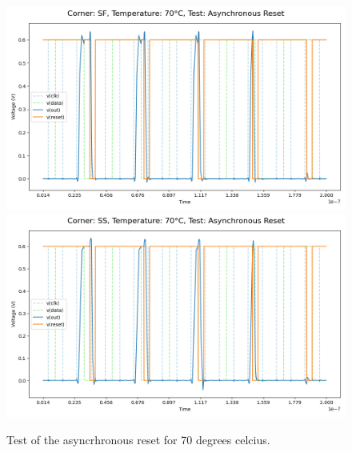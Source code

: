 \begin{figure}[H]
    \vspace{5pt}
    \includegraphics[height= 0.21\textheight]{figures/aimspice/SF/70/W2.csv.png}
    \vspace{5pt}
    \includegraphics[height= 0.21\textheight]{figures/aimspice/SS/70/W2.csv.png}
    \caption{Test of the asyncrhronous reset for 70 degrees celcius.}
    \label{fig:aimspice_W2_70}
\end{figure}

\pagebreak

